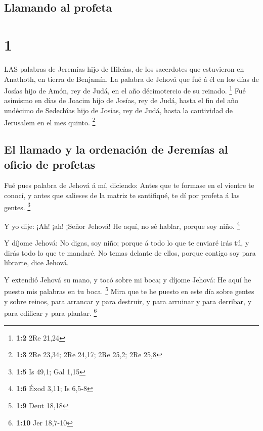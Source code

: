 \hypertarget{llamando-al-profeta}{%
\subsection{Llamando al profeta}\label{llamando-al-profeta}}

\hypertarget{section}{%
\section{1}\label{section}}

 LAS palabras de Jeremías hijo de Hilcías, de los sacerdotes
que estuvieron en Anathoth, en tierra de Benjamín.  La
palabra de Jehová que fué á él en los días de Josías hijo de Amón, rey
de Judá, en el año décimotercio de su reinado. \footnote{\textbf{1:2}
  2Re 21,24}  Fué asimismo en días de Joacim hijo de Josías,
rey de Judá, hasta el fin del año undécimo de Sedechîas hijo de Josías,
rey de Judá, hasta la cautividad de Jerusalem en el mes quinto.
\footnote{\textbf{1:3} 2Re 23,34; 2Re 24,17; 2Re 25,2; 2Re 25,8}

\hypertarget{el-llamado-y-la-ordenaciuxf3n-de-jeremuxedas-al-oficio-de-profetas}{%
\subsection{El llamado y la ordenación de Jeremías al oficio de
profetas}\label{el-llamado-y-la-ordenaciuxf3n-de-jeremuxedas-al-oficio-de-profetas}}

 Fué pues palabra de Jehová á mí, diciendo: 
Antes que te formase en el vientre te conocí, y antes que salieses de la
matriz te santifiqué, te dí por profeta á las gentes. \footnote{\textbf{1:5}
  Is 49,1; Gal 1,15}

 Y yo dije: ¡Ah! ¡ah! ¡Señor Jehová! He aquí, no sé hablar,
porque soy niño. \footnote{\textbf{1:6} Éxod 3,11; Is 6,5-8}

 Y díjome Jehová: No digas, soy niño; porque á todo lo que
te enviaré irás tú, y dirás todo lo que te mandaré.  No
temas delante de ellos, porque contigo soy para librarte, dice Jehová.

 Y extendió Jehová su mano, y tocó sobre mi boca; y díjome
Jehová: He aquí he puesto mis palabras en tu boca. \footnote{\textbf{1:9}
  Deut 18,18}  Mira que te he puesto en este día sobre
gentes y sobre reinos, para arrancar y para destruir, y para arruinar y
para derribar, y para edificar y para plantar. \footnote{\textbf{1:10}
  Jer 18,7-10}

